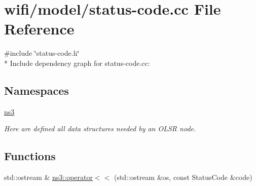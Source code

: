 \hypertarget{status-code_8cc}{}\section{wifi/model/status-\/code.cc File Reference}
\label{status-code_8cc}
{\ttfamily \#include \char`\"{}status-\/code.\+h\char`\"{}}\\*
Include dependency graph for status-\/code.cc\+:
\subsection*{Namespaces}
\begin{DoxyCompactItemize}
\item 
 \hyperlink{namespacens3}{ns3}
\begin{DoxyCompactList}\small\item\em Here are defined all data structures needed by an O\+L\+SR node. \end{DoxyCompactList}\end{DoxyCompactItemize}
\subsection*{Functions}
\begin{DoxyCompactItemize}
\item 
std\+::ostream \& \hyperlink{namespacens3_ae66e05fb0310369670cbe866a045c962}{ns3\+::operator$<$$<$} (std\+::ostream \&os, const Status\+Code \&code)
\end{DoxyCompactItemize}
